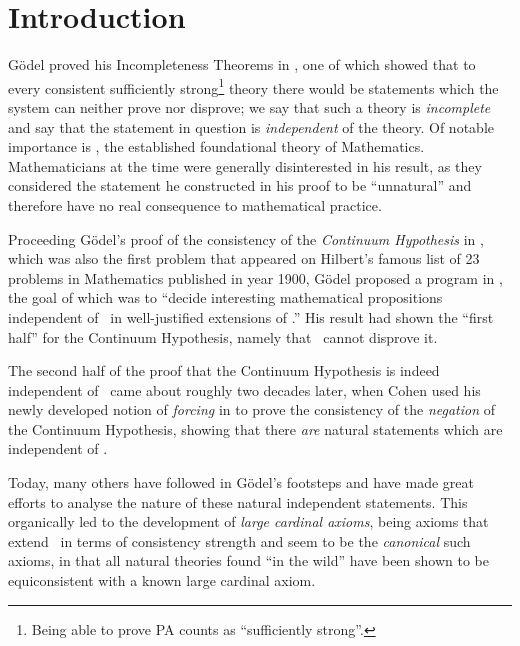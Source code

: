 \documentclass[../main]{subfiles}
\begin{document}
\chapter{Introduction}
\thispagestyle{fancy}

\setlength{\parindent}{18pt}
\begin{onehalfspacing}

G\"odel proved his Incompleteness Theorems in \cite{godel-incompleteness}, one of which showed that to every consistent sufficiently strong\footnote{Being able to prove \textsf{PA} counts as ``sufficiently strong''.} theory there would be statements which the system can neither prove nor disprove; we say that such a theory is \textit{incomplete} and say that the statement in question is \textit{independent} of the theory. Of notable importance is \zfc, the established foundational theory of Mathematics. Mathematicians at the time were generally disinterested in his result, as they considered the statement he constructed in his proof to be ``unnatural'' and therefore have no real consequence to mathematical practice.

\quad Proceeding G\"odel's proof of the consistency of the \textit{Continuum Hypothesis} in \cite{godel-continuum}, which was also the first problem that appeared on Hilbert's famous list of 23 problems in Mathematics published in year 1900, G\"odel proposed a program in \cite{godel-continuum-problem}, the goal of which was to ``decide interesting mathematical propositions independent of \zfc\ in well-justified extensions of \zfc.'' His result had shown the ``first half'' for the Continuum Hypothesis, namely that \zfc\ cannot disprove it.

\quad The second half of the proof that the Continuum Hypothesis is indeed independent of \zfc\ came about roughly two decades later, when Cohen used his newly developed notion of \textit{forcing} in \cite{cohen} to prove the consistency of the \textit{negation} of the Continuum Hypothesis, showing that there \textit{are} natural statements which are independent of \zfc.

\quad Today, many others have followed in G\"odel's footsteps and have made great efforts to analyse the nature of these natural independent statements. This organically led to the development of \textit{large cardinal axioms}, being axioms that extend \zfc\ in terms of consistency strength and seem to be the \textit{canonical} such axioms, in that all natural theories found ``in the wild'' have been shown to be equiconsistent with a known large cardinal axiom.


\end{onehalfspacing}
\end{document}
